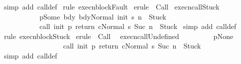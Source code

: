 \begin{isabellebody}
%
\isadelimproof
%
\endisadelimproof
%
\isatagproof
{}\isamarkupfalse%
\ {\isacharparenleft}simp\ add{\isacharcolon}\ call{\isacharunderscore}def{\isacharparenright}\isanewline
{}\isamarkupfalse%
\ {\isacharparenleft}rule\ execn{\isacharunderscore}blockFault{\isacharparenright}\isanewline
{}\isamarkupfalse%
\ {\isacharparenleft}erule\ {\isacharparenleft}{}{\isacharparenright}\ Call{\isacharparenright}\isanewline
{}\isamarkupfalse%
%
\endisatagproof
{\isafoldproof}%
%
\isadelimproof
\isanewline
%
\endisadelimproof
\isanewline
{}\isamarkupfalse%
\ execn{\isacharunderscore}callStuck{\isacharcolon}\ \isanewline
\ \ \ \ \ \ \ \ \ \ {\isachardoublequoteopen}{\isasymlbrakk}{\isasymGamma}\ p{\isacharequal}Some\ bdy{\isacharsemicolon}\ {\isasymGamma}{\isasymturnstile}{\isasymlangle}bdy{\isacharcomma}Normal\ {\isacharparenleft}init\ s{\isacharparenright}{\isasymrangle}\ {\isacharequal}n{\isasymRightarrow}\ \ Stuck{\isasymrbrakk}\ \isanewline
\ \ \ \ \ \ \ \ \ \ \ {\isasymLongrightarrow}\ \isanewline
\ \ \ \ \ \ \ \ \ \ \ {\isasymGamma}{\isasymturnstile}{\isasymlangle}call\ init\ p\ return\ c{\isacharcomma}Normal\ s{\isasymrangle}\ {\isacharequal}Suc\ n{\isasymRightarrow}\ \ Stuck{\isachardoublequoteclose}\isanewline
%
\isadelimproof
%
\endisadelimproof
%
\isatagproof
{}\isamarkupfalse%
\ {\isacharparenleft}simp\ add{\isacharcolon}\ call{\isacharunderscore}def{\isacharparenright}\isanewline
{}\isamarkupfalse%
\ {\isacharparenleft}rule\ execn{\isacharunderscore}blockStuck{\isacharparenright}\isanewline
{}\isamarkupfalse%
\ {\isacharparenleft}erule\ {\isacharparenleft}{}{\isacharparenright}\ Call{\isacharparenright}\isanewline
{}\isamarkupfalse%
%
\endisatagproof
{\isafoldproof}%
%
\isadelimproof
\isanewline
%
\endisadelimproof
\isanewline
{}\isamarkupfalse%
\ \ execn{\isacharunderscore}callUndefined{\isacharcolon}\ \isanewline
\ \ \ \ \ \ \ {\isachardoublequoteopen}{\isasymlbrakk}{\isasymGamma}\ p{\isacharequal}None{\isasymrbrakk}\ \isanewline
\ \ \ \ \ \ \ \ {\isasymLongrightarrow}\ \isanewline
\ \ \ \ \ \ \ \ {\isasymGamma}{\isasymturnstile}{\isasymlangle}call\ init\ p\ return\ c{\isacharcomma}Normal\ s{\isasymrangle}\ {\isacharequal}Suc\ n{\isasymRightarrow}\ \ Stuck{\isachardoublequoteclose}\isanewline
%
\isadelimproof
%
\endisadelimproof
%
\isatagproof
{}\isamarkupfalse%
\ {\isacharparenleft}simp\ add{\isacharcolon}\ call{\isacharunderscore}def{\isacharparenright}\isanewline

\end{isabellebody}
